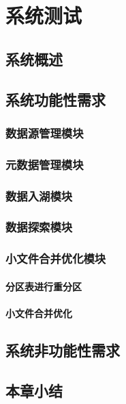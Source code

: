 
\chapter{系统测试}



\section{系统概述}



\section{系统功能性需求}



\subsection{数据源管理模块}



\subsection{元数据管理模块}




\subsection{数据入湖模块}



\subsection{数据探索模块}



\subsection{小文件合并优化模块}



\subsubsection{分区表进行重分区}



\subsubsection{小文件合并优化}



\section{系统非功能性需求}


\section{本章小结}


